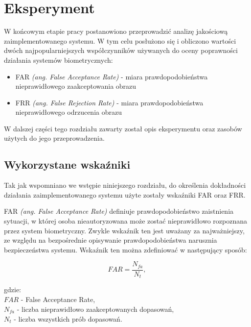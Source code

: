 \chapter{Eksperyment}

W końcowym etapie pracy postanowiono przeprowadzi\'c analizę jakościową zaimplementowanego
systemu. W tym celu posłużono się i obliczono wartości dwóch najpopularniejszych współczynników
używanych do oceny poprawności działania systemów biometrycznych:

\begin{itemize}
  \item FAR \textit{(ang. False Acceptance Rate)} - miara prawdopodobieństwa nieprawidłowego zaakceptowania
  obrazu
  \item FRR \textit{(ang. False Rejection Rate)} - miara prawdopodobieństwa nieprawidłowego odrzucenia
  obrazu
\end{itemize}

W dalszej części tego rozdziału zawarty został opis eksperymentu oraz zasobów użytych do jego
przeprowadzenia.

\section{Wykorzystane wska\'zniki}

Tak jak wspomniano we wstępie niniejszego rozdziału, do określenia dokładności działania zaimplementowanego
systemu użyte zostały wska\'zniki FAR oraz FRR. \newline

FAR \textit{(ang. False Acceptance Rate)} definiuje prawdopodobieństwo zaistnienia sytuacji, w której
osoba nieautoryzowana może zosta\'c nieprawidłowo rozpoznana przez system biometryczny. Zwykle wska\'znik ten
jest uważany za najważniejszy, ze względu na bezpośrednie opisywanie prawdopodobieństwa narusznia
bezpieczeństwa systemu. Wska\'znik ten można zdefiniowa\'c w następujący sposób:

\begin{equation}
  \mathit{FAR} = \frac{N_{\mathit{fa}}}{N_{t}},
\end{equation}

\noindent
gdzie:\\
\indent $\mathit{FAR}$ - False Acceptance Rate,\\
\indent $N_{\mathit{fa}}$ - liczba nieprawidłowo zaakceptowanych dopasowań,\\
\indent $N_{t}$ - liczba wszystkich prób dopasowań.\newline

